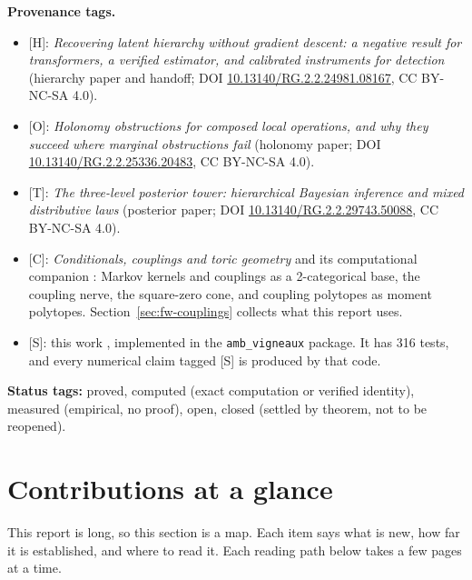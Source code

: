 \documentclass[11pt]{article}
\theoremstyle{definition}
\theoremstyle{remark}
\newcommand{\src}[1]{\textsf{\small[#1]}}
\newcommand{\st}[1]{\textsf{\small\color{gray}#1}}
\begin{document}
\noindent\textbf{Provenance tags.}
\begin{itemize}
  \item \src{H}: \emph{Recovering latent hierarchy without gradient descent: a negative result for transformers, a verified estimator, and calibrated instruments for detection} \cite{awasthiH} (hierarchy paper and handoff; DOI \href{https://doi.org/10.13140/RG.2.2.24981.08167}{10.13140/RG.2.2.24981.08167}, CC BY-NC-SA 4.0).
  \item \src{O}: \emph{Holonomy obstructions for composed local operations, and why they succeed where marginal obstructions fail} \cite{awasthiO} (holonomy paper; DOI \href{https://doi.org/10.13140/RG.2.2.25336.20483}{10.13140/RG.2.2.25336.20483}, CC BY-NC-SA 4.0).
  \item \src{T}: \emph{The three-level posterior tower: hierarchical Bayesian inference and mixed distributive laws} \cite{awasthiT} (posterior paper; DOI \href{https://doi.org/10.13140/RG.2.2.29743.50088}{10.13140/RG.2.2.29743.50088}, CC BY-NC-SA 4.0).
  \item \src{C}: \emph{Conditionals, couplings and toric geometry} \cite{awasthiC} and its computational companion \cite{awasthiF}: Markov kernels and couplings as a 2-categorical base, the coupling nerve, the square-zero cone, and coupling polytopes as moment polytopes. Section~\ref{sec:fw-couplings} collects what this report uses.
  \item \src{S}: this work \cite{awasthiS}, implemented in the \texttt{amb\_vigneaux} package. It has 316 tests, and every numerical claim tagged \src{S} is produced by that code.
\end{itemize}
\noindent\textbf{Status tags:} \st{proved}, \st{computed} (exact computation or verified identity), \st{measured} (empirical, no proof), \st{open}, \st{closed} (settled by theorem, not to be reopened).

\tableofcontents
\newpage

\section*{Contributions at a glance}\label{sec:contrib}
This report is long, so this section is a map. Each item says what is new, how far it is established, and where to read it. Each reading path below takes a few pages at a time.
\end{document}
